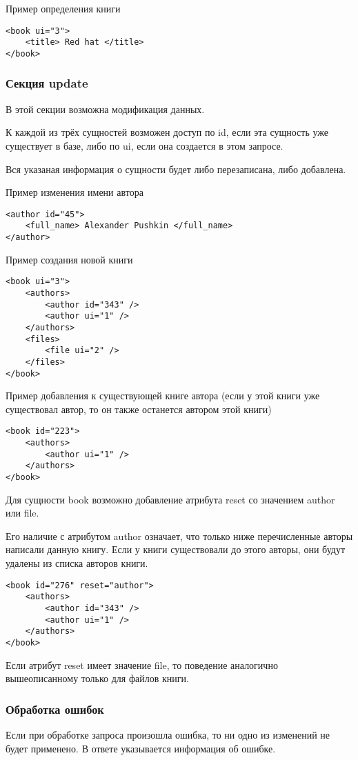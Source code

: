 Пример определения книги 
\begin{verbatim}
<book ui="3">
    <title> Red hat </title>
</book>
\end{verbatim}

\subsubsection{Секция update}

В этой секции возможна модификация данных. 

К каждой из трёх сущностей возможен доступ по id, если эта сущность уже существует в базе, либо по ui, если она создается в этом запросе. 

Вся указаная информация о сущности будет либо перезаписана, либо добавлена. 

Пример изменения имени автора 
\begin{verbatim}
<author id="45">
    <full_name> Alexander Pushkin </full_name>
</author>
\end{verbatim}

Пример создания новой книги 
\begin{verbatim}
<book ui="3">
    <authors>
        <author id="343" />
        <author ui="1" />
    </authors>
    <files>
        <file ui="2" />
    </files>
</book>
\end{verbatim}

Пример добавления к существующей книге автора (если у этой книги уже существовал автор, то он также останется автором этой книги) 
\begin{verbatim}
<book id="223">
    <authors>
        <author ui="1" />
    </authors>
</book>
\end{verbatim}

Для сущности book возможно добавление атрибута reset со значением author или file. 

Его наличие с атрибутом author означает, что только ниже перечисленные авторы написали данную книгу. Если у книги существовали до этого авторы, они будут удалены из списка авторов книги. 
\begin{verbatim}
<book id="276" reset="author">
    <authors>
        <author id="343" />
        <author ui="1" />
    </authors>
</book>
\end{verbatim}

Если атрибут reset имеет значение file, то поведение аналогично вышеописанному только для файлов книги. 

\subsubsection{Обработка ошибок}

Если при обработке запроса произошла ошибка, то ни одно из изменений не будет применено. 
В ответе указывается информация об ошибке.

